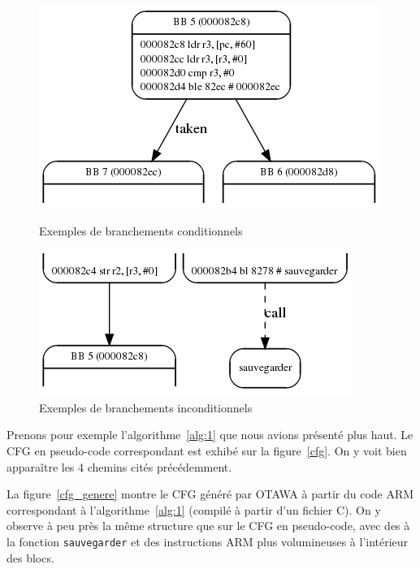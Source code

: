 \documentclass[french]{article}
\newcommand\ccc[1]{\color{red}{#1}\color{black}} %
\begin{document}
  \begin{figure}
    \begin{minipage}[c]{.46\linewidth}
      \includegraphics[scale=0.5]{./pictures/conditional_branch.png}
      \caption{Exemples de branchements conditionnels}
      \label{branchement conditionnel}
   \end{minipage} \hfill
   \begin{minipage}[c]{.46\linewidth}
      \includegraphics[scale=0.5]{./pictures/incoditional_branch.png}
      \caption{Exemples de branchements inconditionnels}
      \label{branchement inconditionnel}
   \end{minipage}
\end{figure}

  \bigbreak

  Prenons pour exemple l'algorithme~\ref{alg:1} que nous avions présenté plus haut. Le CFG en pseudo-code correspondant est exhibé sur la figure~\ref{cfg}. On y voit bien apparaître les 4 chemins cités précédemment. %

  La figure~\ref{cfg_genere} montre le CFG généré par OTAWA à partir du code ARM correspondant à l'algorithme~\ref{alg:1} (compilé à partir d'un fichier C). On y observe à peu près la même structure que sur le CFG en pseudo-code, avec des \ccc{appels} à la fonction \texttt{sauvegarder} et des instructions ARM plus volumineuses à l'intérieur des blocs.
\end{document}
